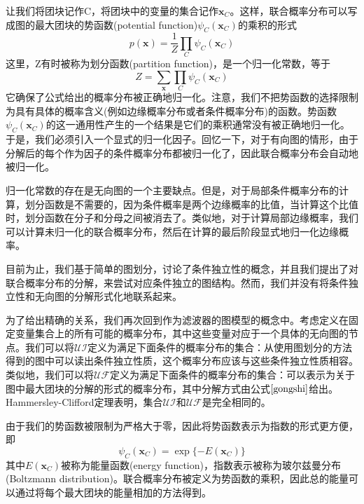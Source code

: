 让我们将团块记作C，将团块中的变量的集合记作$\boldsymbol{x}_C$。这样，联合概率分布可以写成图的最大团块的势函数(potential function)$\psi_C(\boldsymbol{x}_C)$的乘积的形式
\begin{equation}
\label{gongshi}
	p(\boldsymbol{x})=\frac{1}{Z}\prod_{C}\psi_C(\boldsymbol{x}_C)
\end{equation}
这里，Z有时被称为划分函数(partition function)，是一个归一化常数，等于
\begin{equation}
	Z=\sum_{\boldsymbol{x}} \prod_{C}\psi_C(\boldsymbol{x}_C)
\end{equation}
它确保了公式给出的概率分布被正确地归一化。注意，我们不把势函数的选择限制为具有具体的概率含义(例如边缘概率分布或者条件概率分布)的函数。势函数$\psi_C(\boldsymbol{x}_C)$的这一通用性产生的一个结果是它们的乘积通常没有被正确地归一化。于是，我们必须引入一个显式的归一化因子。回忆一下，对于有向图的情形，由于分解后的每个作为因子的条件概率分布都被归一化了，因此联合概率分布会自动地被归一化。

归一化常数的存在是无向图的一个主要缺点。但是，对于局部条件概率分布的计算，划分函数是不需要的，因为条件概率是两个边缘概率的比值，当计算这个比值时，划分函数在分子和分母之间被消去了。类似地，对于计算局部边缘概率，我们可以计算未归一化的联合概率分布，然后在计算的最后阶段显式地归一化边缘概率。

目前为止，我们基于简单的图划分，讨论了条件独立性的概念，并且我们提出了对联合概率分布的分解，来尝试对应条件独立的图结构。然而，我们并没有将条件独立性和无向图的分解形式化地联系起来。

为了给出精确的关系，我们再次回到作为滤波器的图模型的概念中。考虑定义在固定变量集合上的所有可能的概率分布，其中这些变量对应于一个具体的无向图的节点。我们可以将$\mathcal{UI}$定义为满足下面条件的概率分布的集合：从使用图划分的方法得到的图中可以读出条件独立性质，这个概率分布应该与这些条件独立性质相容。类似地，我们可以将$\mathcal{UF}$定义为满足下面条件的概率分布的集合：可以表示为关于图中最大团块的分解的形式的概率分布，其中分解方式由公式$\ref{gongshi}$给出。Hammersley-Clifford定理表明，集合$\mathcal{UI}$和$\mathcal{UF}$是完全相同的。

由于我们的势函数被限制为严格大于零，因此将势函数表示为指数的形式更方便，即
\begin{equation}
	\psi_C(\boldsymbol{x}_C)=\exp\{-E(\boldsymbol{x}_C)\}
\end{equation}
其中$E(\boldsymbol{x}_C)$被称为能量函数(energy function)，指数表示被称为玻尔兹曼分布(Boltzmann distribution)。联合概率分布被定义为势函数的乘积，因此总的能量可以通过将每个最大团块的能量相加的方法得到。


